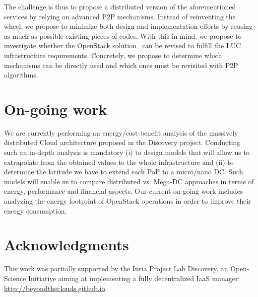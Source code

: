 \documentclass[conference]{IEEEtran}
\begin{document}
The challenge is thus to propose a distributed version of the
aforementioned services by relying on advanced P2P mechanisms.
Instead of reinventing the wheel, we propose to minimize both design
and implementation efforts by reusing as much as possible existing
pieces of codes. With this in mind, we propose to investigate whether
the OpenStack solution~\cite{openstack} can be revised to fulfill
the LUC infrastructure requirements. Concretely, we propose to
determine which mechanisms can be directly used and which ones must be
revisited with P2P algorithms. %


\section{On-going work}
We are currently performing an energy/cost-benefit analysis of the massively distributed Cloud architecture proposed in the Discovery project. Conducting such an in-depth analysis is mandatory (i) to design models that will allow us to extrapolate from the obtained values to the whole infrastructure and (ii) to determine the latitude we have to extend each PoP to a micro/nano DC. Such models will enable us to compare distributed vs. Mega-DC approaches in terms of energy, performance and financial aspects. Our current on-going work includes analyzing the energy footprint of OpenStack operations in order to improve their energy consumption.


\section*{Acknowledgments}
This work was partially supported by the Inria Project Lab Discovery, an Open-Science Initiative aiming at implementing a fully decentralized IaaS manager: \url{http://beyondtheclouds.github.io}.



\end{document}
